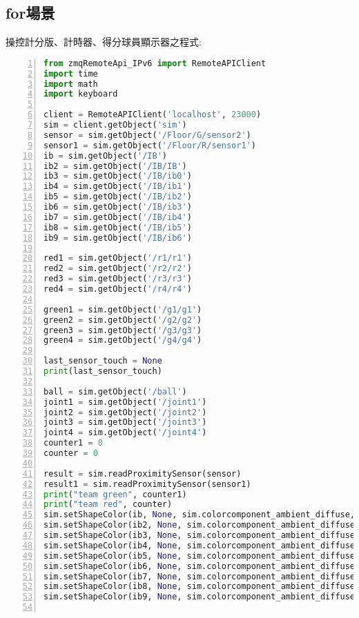 \subsection{for場景}
\begin{flushleft}
\fontsize{14pt}{20pt}\sectionef\hspace{12pt}\quad 操控計分版、計時器、得分球員顯示器之程式:
\end{flushleft}

\begin{lstlisting}[language=Python, frame=single, numbers=left, captionpos=b, basicstyle=\ttfamily\small, showstringspaces=false, breaklines=true, tabsize=4, xleftmargin=15pt]
from zmqRemoteApi_IPv6 import RemoteAPIClient
import time
import math
import keyboard
 
client = RemoteAPIClient('localhost', 23000)
sim = client.getObject('sim')
sensor = sim.getObject('/Floor/G/sensor2')
sensor1 = sim.getObject('/Floor/R/sensor1')
ib = sim.getObject('/IB')
ib2 = sim.getObject('/IB/IB')
ib3 = sim.getObject('/IB/ib0')
ib4 = sim.getObject('/IB/ib1')
ib5 = sim.getObject('/IB/ib2')
ib6 = sim.getObject('/IB/ib3')
ib7 = sim.getObject('/IB/ib4')
ib8 = sim.getObject('/IB/ib5')
ib9 = sim.getObject('/IB/ib6')
 
red1 = sim.getObject('/r1/r1')
red2 = sim.getObject('/r2/r2')
red3 = sim.getObject('/r3/r3')
red4 = sim.getObject('/r4/r4')
 
green1 = sim.getObject('/g1/g1')
green2 = sim.getObject('/g2/g2')
green3 = sim.getObject('/g3/g3')
green4 = sim.getObject('/g4/g4')
 
last_sensor_touch = None
print(last_sensor_touch)
 
ball = sim.getObject('/ball')
joint1 = sim.getObject('/joint1')
joint2 = sim.getObject('/joint2')
joint3 = sim.getObject('/joint3')
joint4 = sim.getObject('/joint4')
counter1 = 0
counter = 0
 
result = sim.readProximitySensor(sensor)
result1 = sim.readProximitySensor(sensor1)
print("team green", counter1)
print("team red", counter)
sim.setShapeColor(ib, None, sim.colorcomponent_ambient_diffuse, [0, 0, 1])
sim.setShapeColor(ib2, None, sim.colorcomponent_ambient_diffuse, [0, 0, 1])
sim.setShapeColor(ib3, None, sim.colorcomponent_ambient_diffuse, [1, 1, 1])
sim.setShapeColor(ib4, None, sim.colorcomponent_ambient_diffuse, [1, 1, 1])
sim.setShapeColor(ib5, None, sim.colorcomponent_ambient_diffuse, [1, 1, 1])
sim.setShapeColor(ib6, None, sim.colorcomponent_ambient_diffuse, [0, 0, 0])
sim.setShapeColor(ib7, None, sim.colorcomponent_ambient_diffuse, [1, 1, 1])
sim.setShapeColor(ib8, None, sim.colorcomponent_ambient_diffuse, [1, 1, 1])
sim.setShapeColor(ib9, None, sim.colorcomponent_ambient_diffuse, [1, 1, 1])
 

\end{lstlisting}
